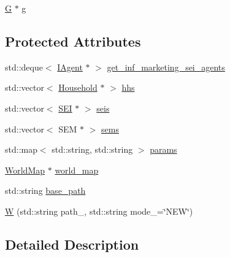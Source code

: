 {\bf }\par
\begin{DoxyCompactItemize}
\item 
\hyperlink{classsolar__core_1_1_g}{G} $\ast$ \hyperlink{classsolar__core_1_1_w_a9e50ef0da579cdfc3da22c16a492bc44}{g}
\end{DoxyCompactItemize}

\subsection*{Protected Attributes}
\begin{DoxyCompactItemize}
\item 
std\+::deque$<$ \hyperlink{classsolar__core_1_1_i_agent}{I\+Agent} $\ast$ $>$ \hyperlink{classsolar__core_1_1_w_a81b5469757f203c9619ff69323ac0f77}{get\+\_\+inf\+\_\+marketing\+\_\+sei\+\_\+agents}
\item 
std\+::vector$<$ \hyperlink{classsolar__core_1_1_household}{Household} $\ast$ $>$ \hyperlink{classsolar__core_1_1_w_a17c012ff8b17890ed33923cec6d87be3}{hhs}
\item 
std\+::vector$<$ \hyperlink{classsolar__core_1_1_s_e_i}{S\+E\+I} $\ast$ $>$ \hyperlink{classsolar__core_1_1_w_a311baa30390494ae8e79f26e372e716d}{seis}
\item 
std\+::vector$<$ S\+E\+M $\ast$ $>$ \hyperlink{classsolar__core_1_1_w_ab6349cbc751747a05618dad4ebb1b726}{sems}
\item 
std\+::map$<$ std\+::string, std\+::string $>$ \hyperlink{classsolar__core_1_1_w_a0d06bc7242f8b3958986118eb217583f}{params}
\item 
\hyperlink{classsolar__core_1_1_world_map}{World\+Map} $\ast$ \hyperlink{classsolar__core_1_1_w_a8ed6f1aa7fd4ef2c3488147b38a670b7}{world\+\_\+map}
\end{DoxyCompactItemize}
\begin{DoxyCompactItemize}
\item 
std\+::string \hyperlink{classsolar__core_1_1_w_acf6e7dd195573ba04b406cde2e5b80fb}{base\+\_\+path}
\item 
\hyperlink{classsolar__core_1_1_w_aa252edac9babf33b41e22a816648a9a5}{W} (std\+::string path\+\_\+, std\+::string mode\+\_\+=\char`\"{}N\+E\+W\char`\"{})
\end{DoxyCompactItemize}


\subsection{Detailed Description}


